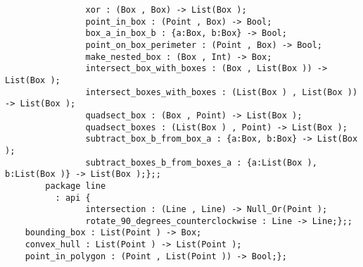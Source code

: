 \begin{verbatim}
                xor : (Box , Box) -> List(Box );
                point_in_box : (Point , Box) -> Bool;
                box_a_in_box_b : {a:Box, b:Box} -> Bool;
                point_on_box_perimeter : (Point , Box) -> Bool;
                make_nested_box : (Box , Int) -> Box;
                intersect_box_with_boxes : (Box , List(Box )) -> List(Box );
                intersect_boxes_with_boxes : (List(Box ) , List(Box )) -> List(Box );
                quadsect_box : (Box , Point) -> List(Box );
                quadsect_boxes : (List(Box ) , Point) -> List(Box );
                subtract_box_b_from_box_a : {a:Box, b:Box} -> List(Box );
                subtract_boxes_b_from_boxes_a : {a:List(Box ), b:List(Box )} -> List(Box );};;
        package line
          : api {
                intersection : (Line , Line) -> Null_Or(Point );
                rotate_90_degrees_counterclockwise : Line -> Line;};;
    bounding_box : List(Point ) -> Box;
    convex_hull : List(Point ) -> List(Point );
    point_in_polygon : (Point , List(Point )) -> Bool;};
\end{verbatim}
